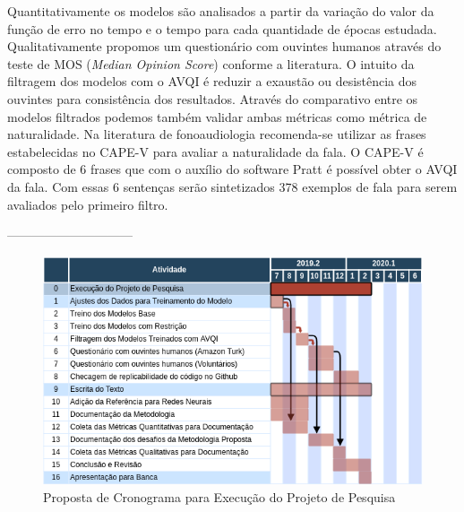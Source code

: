 \documentclass{article}
\begin{document}
Quantitativamente os modelos são analisados a partir da variação do valor da função de erro no tempo e o tempo para cada quantidade de épocas estudada.
Qualitativamente propomos um questionário com ouvintes humanos através do teste de MOS (\textit{Median Opinion Score}) conforme a literatura. 
O intuito da filtragem dos modelos com o AVQI é reduzir a exaustão ou desistência dos ouvintes para consistência dos resultados.
Através do comparativo entre os modelos filtrados podemos também validar ambas métricas como métrica de naturalidade.
Na literatura de fonoaudiologia recomenda-se utilizar as frases estabelecidas no CAPE-V para avaliar a naturalidade da fala. 
O CAPE-V é composto de 6 frases que com o auxílio do software Pratt é possível obter o AVQI da fala.
Com essas 6 sentenças serão sintetizados 378 exemplos de fala para serem avaliados pelo primeiro filtro.

------------------------------
\begin{figure}[h!]
	\centering
	\includegraphics[width=\textwidth]{figuras/cronograma.png}
	\caption{Proposta de Cronograma para Execução do Projeto de Pesquisa}
	\label{fig:processo_de_fala}
\end{figure}

% 

\end{document}
